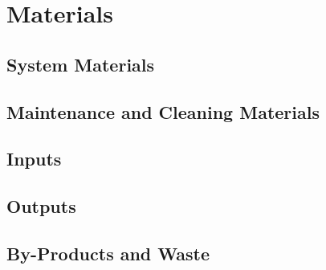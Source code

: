 \section{Materials}
\subsection{System Materials}
\subsection{Maintenance and Cleaning Materials}
\subsection{Inputs}
\subsection{Outputs}
\subsection{By-Products and Waste}